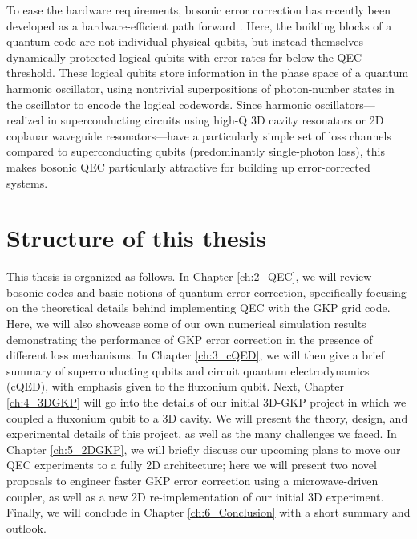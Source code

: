 To ease the hardware requirements, bosonic error correction has recently been developed as a hardware-efficient path forward \cite{terhal2020bosonic, cai2021bosonic, joshi2021bosonic}. Here, the building blocks of a quantum code are not individual physical qubits, but instead themselves dynamically-protected logical qubits with error rates far below the QEC threshold. These logical qubits store information in the phase space of a quantum harmonic oscillator, using nontrivial superpositions of photon-number states in the oscillator to encode the logical codewords. Since harmonic oscillators---realized in superconducting circuits using high-Q 3D cavity resonators or 2D coplanar waveguide resonators---have a particularly simple set of loss channels compared to superconducting qubits (predominantly single-photon loss), this makes bosonic QEC particularly attractive for building up error-corrected systems. 



\section{Structure of this thesis}
This thesis is organized as follows. In Chapter \ref{ch:2_QEC}, we will review bosonic codes and basic notions of quantum error correction, specifically focusing on the theoretical details behind implementing QEC with the GKP grid code. Here, we will also showcase some of our own numerical simulation results demonstrating the performance of GKP error correction in the presence of different loss mechanisms. In Chapter \ref{ch:3_cQED}, we will then give a brief summary of superconducting qubits and circuit quantum electrodynamics (cQED), with emphasis given to the fluxonium qubit. Next, Chapter \ref{ch:4_3DGKP} will go into the details of our initial 3D-GKP project in which we coupled a fluxonium qubit to a 3D cavity. We will present the theory, design, and experimental details of this project, as well as the many challenges we faced. In Chapter \ref{ch:5_2DGKP}, we will briefly discuss our upcoming plans to move our QEC experiments to a fully 2D architecture; here we will present two novel proposals to engineer faster GKP error correction using a microwave-driven coupler, as well as a new 2D re-implementation of our initial 3D experiment. Finally, we will conclude in Chapter \ref{ch:6_Conclusion} with a short summary and outlook.




